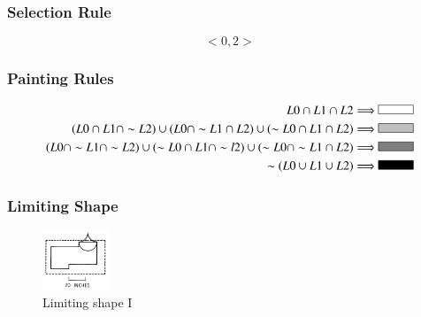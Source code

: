 \documentclass[11pt, a4paper]{report}
\begin{document}
\subsubsection{Selection Rule}
\begin{equation}
<0,2>
\end{equation}

\subsubsection{Painting Rules}
\begin{align}
    \label{fig:Shape Grammars/Shape Specification/Painting_Rule_1}
    L0\cap L1\cap L2 \Longrightarrow  
    \begin{tikzpicture}
        \filldraw[fill=black!00!white, draw=black] (0,0) rectangle (1,0.25);
    \end{tikzpicture} \\
    \label{fig:Shape Grammars/Shape Specification/Painting_Rule_2}
    (L0\cap L1\cap \sim L2)\cup (L0\cap \sim L1\cap L2)\cup (\sim L0\cap L1 \cap L2) \Longrightarrow  
    \begin{tikzpicture}
        \filldraw[fill=black!25!white, draw=black] (0,0) rectangle (1,0.25);
    \end{tikzpicture} \\
    \label{fig:Shape Grammars/Shape Specification/Painting_Rule_3}
    (L0\cap \sim L1\cap \sim L2)\cup (\sim L0\cap L1\cap \sim l2)\cup (\sim L0\cap \sim L1 \cap L2) \Longrightarrow  
    \begin{tikzpicture}
        \filldraw[fill=black!50!white, draw=black] (0,0) rectangle (1,0.25);
    \end{tikzpicture} \\
    \label{fig:Shape Grammars/Shape Specification/Painting_Rule_4}
    \sim (L0\cup L1\cup L2)  \Longrightarrow  
    \begin{tikzpicture}
        \filldraw[fill=black!100!white, draw=black] (0,0) rectangle (1,0.25);
    \end{tikzpicture}
\end{align}
\subsubsection{Limiting Shape}
\begin{figure}[!h]
    \centering
    \includegraphics[width=2cm]{sg_specification_Limiting_shape.jpg}
    \caption{ Limiting shape I \citep{shapeGrammars:1972}}\label{fig:Shape Grammars/Shape Specification/Limiting_Shape}
\end{figure}
\pagebreak
\end{document}
